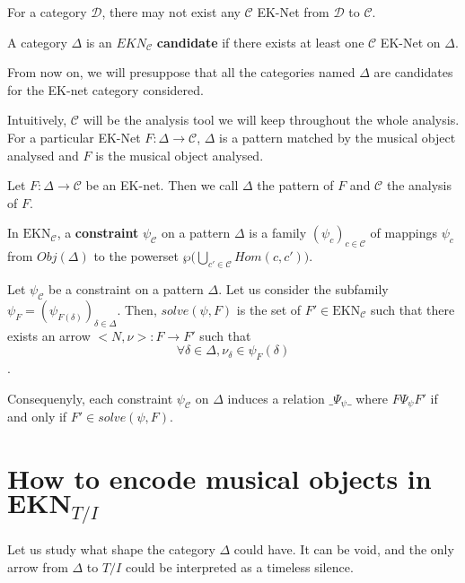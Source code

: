 \documentclass{report}
\begin{document}
For a category $\mathcal{D}$, there may not exist any $\mathcal{C}$ EK-Net from $\mathcal{D}$ to $\mathcal{C}$.
\begin{defn}[EK candidate]
    A category $\Delta$ is an $EKN_{\mathcal{C}}$ \textbf{candidate} if there exists at least one $\mathcal{C}$ EK-Net on $\Delta$.
\end{defn}

\begin{note}
    From now on, we will presuppose that all the categories named $\Delta$ are candidates for the EK-net category considered.
\end{note}

Intuitively, $\mathcal{C}$ will be the analysis tool we will keep throughout the whole analysis. For a particular EK-Net $F : \Delta \rightarrow \mathcal{C}$, $\Delta$ is a pattern matched by the musical object analysed and $F$ is the musical object analysed.

Let $F : \Delta \rightarrow \mathcal{C}$ be an EK-net. Then we call $\Delta$ the pattern of $F$ and $\mathcal{C}$ the analysis of $F$.

\begin{defn}[Constraint]
    In $\text{EKN}_\mathcal{C}$, a \textbf{constraint} $\psi_\mathcal{C}$ on a pattern $\Delta$ is a family $(\psi_c)_{c\in\mathcal{C}}$ of mappings $\psi_c$ from $Obj(\Delta)$ to the powerset $\wp\big(\bigcup_{c'\in\mathcal{C}}Hom(c,c')\big)$.
\end{defn}


\begin{defn}
    Let $\psi_\mathcal{C}$ be a constraint on a pattern $\Delta$.
    Let us consider the subfamily $\psi_F = (\psi_{F(\delta)})_{\delta\in\Delta}$. Then, $solve(\psi,F)$ is the set of $F' \in \text{EKN}_\mathcal{C}$ such that there exists an arrow $\big< N, \nu\big> : F \rightarrow F'$ such that
    $$\forall \delta \in \Delta, \nu_\delta \in \psi_F(\delta)$$.
\end{defn}

Consequenyly, each constraint $\psi_\mathcal{C}$ on $\Delta$ induces a relation
$\_\Psi_\psi \_$ where $F\Psi_\psi F'$ if and only if $F'\in solve(\psi,F)$.



\section{How to encode musical objects in $\textbf{EKN}_{T/I}$}

Let us study what shape the category $\Delta$ could have. It can be void, and the only arrow from $\Delta$ to $T/I$ could be interpreted as a timeless silence.
\end{document}
